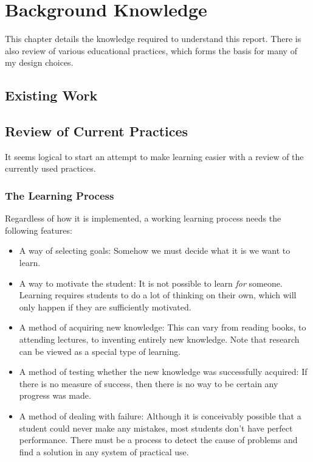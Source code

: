 \chapter{Background Knowledge}
\label{chapter:background}
  This chapter details the knowledge required to understand this report. There is also review of various educational practices, which forms the basis for many of my design choices.

  \section{Existing Work}
  \section{Review of Current Practices}
    It seems logical to start an attempt to make learning easier with a review of the currently used practices.


    \subsection{The Learning Process}
      Regardless of how it is implemented, a working learning process needs the following features:

      \begin{itemize}
        \item A way of selecting goals: Somehow we must decide what it is we want to learn.

        \item A way to motivate the student: It is not possible to learn \emph{for} someone. Learning requires students to do a lot of thinking on their own, which will only happen if they are sufficiently motivated.

        \item A method of acquiring new knowledge: This can vary from reading books, to attending lectures, to inventing entirely new knowledge. Note that research can be viewed as a special type of learning.

        \item A method of testing whether the new knowledge was successfully acquired: If there is no measure of success, then there is no way to be certain any progress was made.

        \item A method of dealing with failure: Although it is conceivably possible that a student could never make any mistakes, most students don't have perfect performance. There must be a process to detect the cause of problems and find a solution in any system of practical use.
      \end{itemize}



